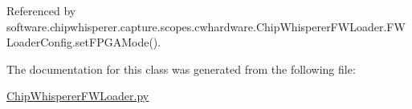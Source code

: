 Referenced by software.\+chipwhisperer.\+capture.\+scopes.\+cwhardware.\+Chip\+Whisperer\+F\+W\+Loader.\+F\+W\+Loader\+Config.\+set\+F\+P\+G\+A\+Mode().



The documentation for this class was generated from the following file\+:\begin{DoxyCompactItemize}
\item 
\hyperlink{ChipWhispererFWLoader_8py}{Chip\+Whisperer\+F\+W\+Loader.\+py}\end{DoxyCompactItemize}
